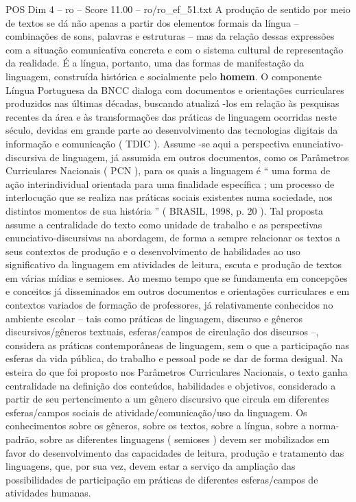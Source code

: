 \begin{textsample}{POS Dim 4 – ro – Score 11.00 – ro/ro\_ef\_51.txt}
A produção de sentido por meio de textos se dá não apenas a partir dos elementos formais da língua – combinações de sons, palavras e estruturas – mas da relação dessas expressões com a situação comunicativa concreta e com o sistema cultural de representação da realidade.
É a língua, portanto, uma das formas de manifestação da linguagem, construída histórica e socialmente pelo \textbf{homem}.
O componente Língua Portuguesa da BNCC dialoga com documentos e orientações curriculares produzidos nas últimas décadas, buscando atualizá -los em relação às pesquisas recentes da área e às transformações das práticas de linguagem ocorridas neste século, devidas em grande parte ao desenvolvimento das tecnologias digitais da informação e comunicação ( TDIC ).
Assume -se aqui a perspectiva enunciativo-discursiva de linguagem, já assumida em outros documentos, como os Parâmetros Curriculares Nacionais ( PCN ), para os quais a linguagem é “ uma forma de ação interindividual orientada para uma finalidade específica ; um processo de interlocução que se realiza nas práticas sociais existentes numa sociedade, nos distintos momentos de sua história ” ( BRASIL, 1998, p. 20 ).
Tal proposta assume a centralidade do texto como unidade de trabalho e as perspectivas enunciativo-discursivas na abordagem, de forma a sempre relacionar os textos a seus contextos de produção e o desenvolvimento de habilidades ao uso significativo da linguagem em atividades de leitura, escuta e produção de textos em várias mídias e semioses.
Ao mesmo tempo que se fundamenta em concepções e conceitos já disseminados em outros documentos e orientações curriculares e em contextos variados de formação de professores, já relativamente conhecidos no ambiente escolar – tais como práticas de linguagem, discurso e gêneros discursivos/gêneros textuais, esferas/campos de circulação dos discursos –, considera as práticas contemporâneas de linguagem, sem o que a participação nas esferas da vida pública, do trabalho e pessoal pode se dar de forma desigual.
Na esteira do que foi proposto nos Parâmetros Curriculares Nacionais, o texto ganha centralidade na definição dos conteúdos, habilidades e objetivos, considerado a partir de seu pertencimento a um gênero discursivo que circula em diferentes esferas/campos sociais de atividade/comunicação/uso da linguagem.
Os conhecimentos sobre os gêneros, sobre os textos, sobre a língua, sobre a norma-padrão, sobre as diferentes linguagens ( semioses ) devem ser mobilizados em favor do desenvolvimento das capacidades de leitura, produção e tratamento das linguagens, que, por sua vez, devem estar a serviço da ampliação das possibilidades de participação em práticas de diferentes esferas/campos de atividades humanas.

\end{textsample}
